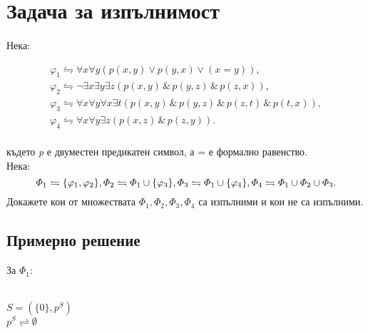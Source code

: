 \documentclass[12pt]{article}
\begin{document}
\newpage
\section{Задача за изпълнимост}
\paragraph{}
Нека:
\begin{addmargin}[1em]{2em}
    \begin{gather*}
        \varphi_1 \leftrightharpoons \forall x \forall y(p(x,y)\lor p(y,x)\lor (x=y)),\\
        \varphi_2 \leftrightharpoons \neg \exists x\exists y\exists z(p(x,y)\,\&\,p(y,z)\,\&\,p(z,x)),\\
        \varphi_3 \leftrightharpoons \forall x\forall y\forall x\exists t (p(x,y)\,\&\,p(y,z)\,\&\,p(z,t)\,\&\,p(t,x)),\\
        \varphi_4 \leftrightharpoons \forall x \forall y \exists z (p(x,z)\,\&\,p(z,y)).\\
    \end{gather*}
\end{addmargin}
където \textit{p} е двуместен предикатен символ, а = е формално равенство.\\
Нека:
\begin{equation*}
    \varPhi_1\leftrightharpoons \{\varphi_1,\varphi_2\},\\
    \varPhi_2\leftrightharpoons \varPhi_1 \cup \{\varphi_3\}, \\
    \varPhi_3\leftrightharpoons \varPhi_1 \cup \{\varphi_4\},\\
    \varPhi_4\leftrightharpoons \varPhi_1 \cup \varPhi_2 \cup\varPhi_3.
\end{equation*}
Докажете кои от множествата $\varPhi_1, \varPhi_2, \varPhi_3, \varPhi_4$ са изпълними и кои не са изпълними.

\subsection{Примерно решение}
\begin{addmargin}[1em]{2em}
    
\begin{center}
    За $\varPhi_1$:\\
 \\
$ S = (\{0\}, p^S)$ \\
$p^S \rightleftharpoons \emptyset$\\
\end{center}
\end{addmargin}
\end{document}
